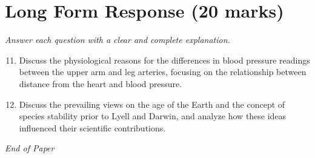 \documentclass[12pt]{article}
\begin{document}
\section*{Long Form Response (20 marks)}
\textit{Answer each question with a clear and complete explanation.}
\begin{enumerate}[label=\arabic*.]
\setcounter{enumi}{10}
\item Discuss the physiological reasons for the differences in blood pressure readings between the upper arm and leg arteries, focusing on the relationship between distance from the heart and blood pressure.
\item Discuss the prevailing views on the age of the Earth and the concept of species stability prior to Lyell and Darwin, and analyze how these ideas influenced their scientific contributions.
\end{enumerate}

\vfill
\noindent\textit{End of Paper}
\end{document}
